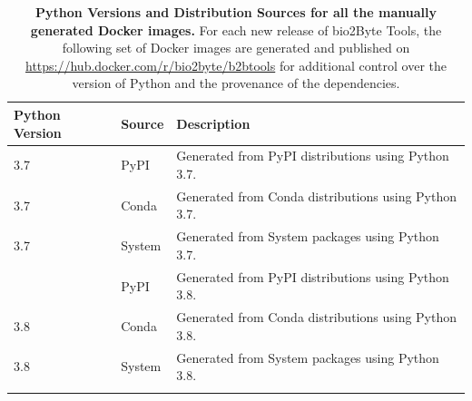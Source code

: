 \begin{table}[ht]
\centering
\caption{\textbf{Python Versions and Distribution Sources for all the manually generated Docker images.} For each new release of bio2Byte Tools, the following set of Docker images are generated and published on \url{https://hub.docker.com/r/bio2byte/b2btools} for additional control over the version of Python and the provenance of the dependencies.}
\label{tab:docker_versions}
\begin{small}
\begin{tabular}{p{1.5cm} l p{8cm}}
\toprule
\textbf{Python Version} & \textbf{Source} & \textbf{Description} \\ \midrule
3.7 & PyPI & Generated from PyPI distributions using Python 3.7. 
\\ %
3.7 & Conda & Generated from Conda distributions using Python 3.7. 
\\ %
3.7 & System & Generated from System packages using Python 3.7. 
\\ \arrayrulecolor[gray]{0.8}\hline
3.8 & PyPI & Generated from PyPI distributions using Python 3.8. 
\\ %
3.8 & Conda & Generated from Conda distributions using Python 3.8. 
\\ %
3.8 & System & Generated from System packages using Python 3.8. 
\\ \arrayrulecolor[gray]{0.8}\hline

\end{tabular}
\end{small}
\end{table}
